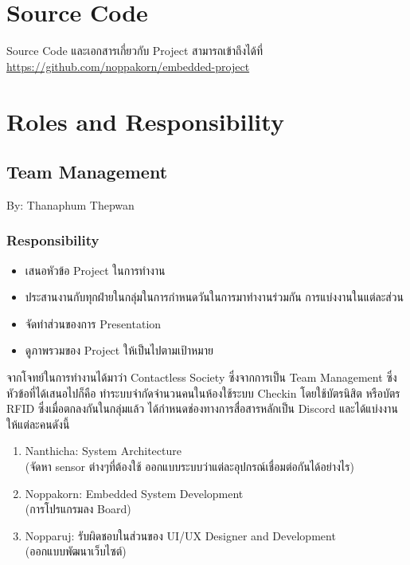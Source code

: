 \documentclass[fontsize=14pt]{extarticle}
\begin{document}
\section{Source Code}
Source Code และเอกสารเกี่ยวกับ Project สามารถเข้าถึงได้ที่ \url{https://github.com/noppakorn/embedded-project}
\pagebreak
\section{Roles and Responsibility}
\subsection{Team Management}
By: Thanaphum Thepwan\\
\subsubsection{Responsibility}
\begin{itemize}
    \item เสนอหัวข้อ Project ในการทำงาน
    \item ประสานงานกับทุกฝ่ายในกลุ่มในการกำหนดวันในการมาทำงานร่วมกัน การแบ่งงานในแต่ละส่วน
    \item จัดทำส่วนของการ Presentation
    \item ดูภาพรวมของ Project ให้เป็นไปตามเป้าหมาย
\end{itemize}
จากโจทย์ในการทำงานได้มาว่า Contactless Society ซึ่งจากการเป็น Team Management ซึ่งหัวข้อที่ได้เสนอไปก็คือ ทำระบบจำกัดจำนวนคนในห้องใช้ระบบ Checkin โดยใช้บัตรนิสิต หรือบัตร RFID ซึ่งเมื่อตกลงกันในกลุ่มแล้ว ได้กำหนดช่องทางการสื่อสารหลักเป็น Discord และได้แบ่งงานให้แต่ละคนดังนี้
\begin{enumerate}
    \item Nanthicha: System Architecture\\ (จัดหา sensor ต่างๆที่ต้องใช้ ออกแบบระบบว่าแต่ละอุปกรณ์เชื่อมต่อกันได้อย่างไร)
    \item Noppakorn: Embedded System Development \\ (การโปรแกรมลง Board)
    \item Nopparuj: รับผิดชอบในส่วนของ UI/UX Designer and Development\\ (ออกแบบพัฒนาเว็บไซต์)
\end{enumerate}
\end{document}
